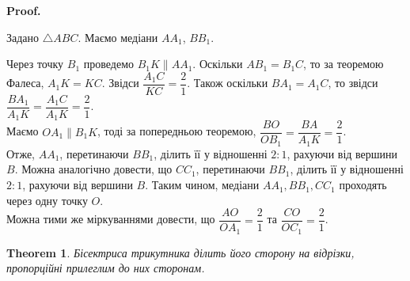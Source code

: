 \documentclass[a4paper, 10pt]{article}
\makeatletter
\theoremstyle{theoremdd}
\newtheorem{theorem}{Theorem}[subsection]
\theoremstyle{theoremdd}
\theoremstyle{theoremdd}
\theoremstyle{theoremdd}
\theoremstyle{theoremdd}
\theoremstyle{theoremdd}
\theoremstyle{theoremdd}
\theoremstyle{theoremdd}
\theoremstyle{theoremdd}
\renewenvironment{proof}[1][Proof.\\]{\par
\pushQED{\hfill \qed}%
\normalfont \topsep6\p@\@plus6\p@\relax
\trivlist
\item\relax
{\bfseries
#1\@addpunct{.}}\hspace\labelsep\ignorespaces
}{%
\popQED\endtrivlist\@endpefalse
}
\makeatother
\begin{document}
\begin{proof}
Задано $\triangle ABC$. Маємо медіани $AA_1$, $BB_1$.
\begin{figure}[H]
\centering
{}
\end{figure}
Через точку $B_1$ проведемо $B_1K \parallel AA_1$. Оскільки $AB_1 = B_1C$, то за теоремою Фалеса, $A_1K = KC$. Звідси $\dfrac{A_1C}{KC} = \dfrac{2}{1}$. Також оскільки $BA_1 = A_1C$, то звідси $\dfrac{BA_1}{A_1K} = \dfrac{A_1C}{A_1K} = \dfrac{2}{1}$.\\
Маємо $OA_1 \parallel B_1K$, тоді за попередньою теоремою, $\dfrac{BO}{OB_1} = \dfrac{BA}{A_1K} = \dfrac{2}{1}$.\\
Отже, $AA_1$, перетинаючи $BB_1$, ділить її у відношенні $2 : 1$, рахуючи від вершини $B$. Можна аналогічно довести, що $CC_1$, перетинаючи $BB_1$, ділить її у відношенні $2 : 1$, рахуючи від вершини $B$. Таким чином, медіани $AA_1,BB_1,CC_1$ проходять через одну точку $O$.
\bigskip \\
Можна тими же міркуваннями довести, що $\dfrac{AO}{OA_1} = \dfrac{2}{1}$ та $\dfrac{CO}{OC_1} = \dfrac{2}{1}$.
\end{proof}

\begin{theorem}
Бісектриса трикутника ділить його сторону на відрізки, пропорційні прилеглим до них сторонам.
\end{theorem}
\end{document}
